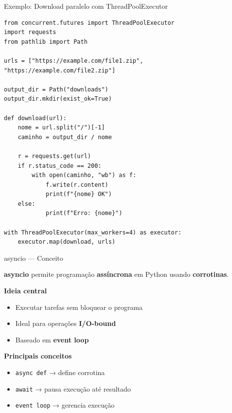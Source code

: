 \documentclass{beamer}
\begin{document}
\begin{frame}[fragile]{Exemplo: Download paralelo com ThreadPoolExecutor}
    
    \begin{verbatim}
from concurrent.futures import ThreadPoolExecutor
import requests
from pathlib import Path

urls = ["https://example.com/file1.zip", "https://example.com/file2.zip"]

output_dir = Path("downloads")
output_dir.mkdir(exist_ok=True)

def download(url):
    nome = url.split("/")[-1]
    caminho = output_dir / nome

    r = requests.get(url)
    if r.status_code == 200:
        with open(caminho, "wb") as f:
            f.write(r.content)
            print(f"{nome} OK")
    else:
            print(f"Erro: {nome}")

with ThreadPoolExecutor(max_workers=4) as executor:
    executor.map(download, urls)
    \end{verbatim}
    
\end{frame}

\begin{frame}[fragile]{asyncio — Conceito}
    
    \textbf{asyncio} permite programação \textbf{assíncrona} em Python usando \textbf{corrotinas}.
    
    \vspace{0.4cm}
    
    \textbf{Ideia central}
    
    \begin{itemize}
        \item Executar tarefas sem bloquear o programa
        \item Ideal para operações \textbf{I/O-bound}
        \item Baseado em \textbf{event loop}
    \end{itemize}
    
    \vspace{0.4cm}
    
    \textbf{Principais conceitos}
    
    \begin{itemize}
        \item \texttt{async def} → define corrotina
        \item \texttt{await} → pausa execução até resultado
        \item \texttt{event loop} → gerencia execução
    \end{itemize}
    
\end{frame}
\end{document}
